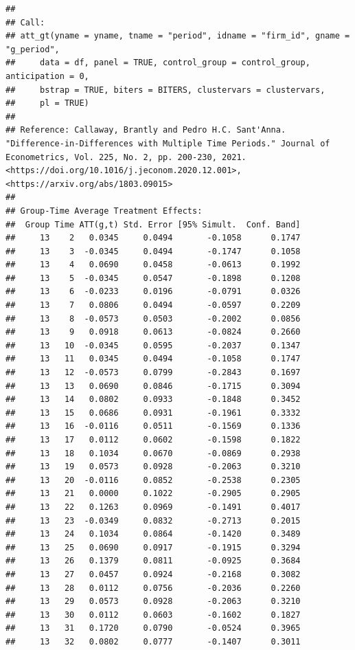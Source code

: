 \documentclass[
]{article}
\begin{document}
\begin{verbatim}
## 
## Call:
## att_gt(yname = yname, tname = "period", idname = "firm_id", gname = "g_period", 
##     data = df, panel = TRUE, control_group = control_group, anticipation = 0, 
##     bstrap = TRUE, biters = BITERS, clustervars = clustervars, 
##     pl = TRUE)
## 
## Reference: Callaway, Brantly and Pedro H.C. Sant'Anna.  "Difference-in-Differences with Multiple Time Periods." Journal of Econometrics, Vol. 225, No. 2, pp. 200-230, 2021. <https://doi.org/10.1016/j.jeconom.2020.12.001>, <https://arxiv.org/abs/1803.09015> 
## 
## Group-Time Average Treatment Effects:
##  Group Time ATT(g,t) Std. Error [95% Simult.  Conf. Band]  
##     13    2   0.0345     0.0494       -0.1058      0.1747  
##     13    3  -0.0345     0.0494       -0.1747      0.1058  
##     13    4   0.0690     0.0458       -0.0613      0.1992  
##     13    5  -0.0345     0.0547       -0.1898      0.1208  
##     13    6  -0.0233     0.0196       -0.0791      0.0326  
##     13    7   0.0806     0.0494       -0.0597      0.2209  
##     13    8  -0.0573     0.0503       -0.2002      0.0856  
##     13    9   0.0918     0.0613       -0.0824      0.2660  
##     13   10  -0.0345     0.0595       -0.2037      0.1347  
##     13   11   0.0345     0.0494       -0.1058      0.1747  
##     13   12  -0.0573     0.0799       -0.2843      0.1697  
##     13   13   0.0690     0.0846       -0.1715      0.3094  
##     13   14   0.0802     0.0933       -0.1848      0.3452  
##     13   15   0.0686     0.0931       -0.1961      0.3332  
##     13   16  -0.0116     0.0511       -0.1569      0.1336  
##     13   17   0.0112     0.0602       -0.1598      0.1822  
##     13   18   0.1034     0.0670       -0.0869      0.2938  
##     13   19   0.0573     0.0928       -0.2063      0.3210  
##     13   20  -0.0116     0.0852       -0.2538      0.2305  
##     13   21   0.0000     0.1022       -0.2905      0.2905  
##     13   22   0.1263     0.0969       -0.1491      0.4017  
##     13   23  -0.0349     0.0832       -0.2713      0.2015  
##     13   24   0.1034     0.0864       -0.1420      0.3489  
##     13   25   0.0690     0.0917       -0.1915      0.3294  
##     13   26   0.1379     0.0811       -0.0925      0.3684  
##     13   27   0.0457     0.0924       -0.2168      0.3082  
##     13   28   0.0112     0.0756       -0.2036      0.2260  
##     13   29   0.0573     0.0928       -0.2063      0.3210  
##     13   30   0.0112     0.0603       -0.1602      0.1827  
##     13   31   0.1720     0.0790       -0.0524      0.3965  
##     13   32   0.0802     0.0777       -0.1407      0.3011  

\end{verbatim}
\end{document}
